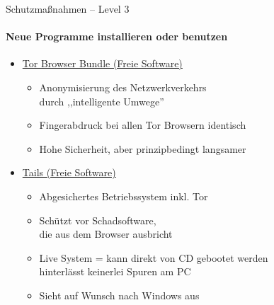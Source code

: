 \begin{frame}{Schutzmaßnahmen -- Level 3}
\framesubtitle{Neue Programme installieren oder benutzen}
  \begin{itemize}
    \item \href{https://www.torproject.org}{Tor Browser Bundle (Freie Software)}
    \begin{itemize}
      \item Anonymisierung des Netzwerkverkehrs\\durch ,,intelligente Umwege''
      \item Fingerabdruck bei allen Tor Browsern identisch
      \item Hohe Sicherheit, aber prinzipbedingt langsamer
    \end{itemize}
    \item \href{https://tails.boum.org}{Tails (Freie Software)}
    \begin{itemize}
      \item Abgesichertes Betriebssystem inkl. Tor
      \item Schützt vor Schadsoftware,\\ die aus dem Browser ausbricht
      \item Live System = kann direkt von CD gebootet werden\\ hinterlässt keinerlei Spuren am PC
      \item Sieht auf Wunsch nach Windows aus
    \end{itemize}
  \end{itemize}
\end{frame}

\endinput
